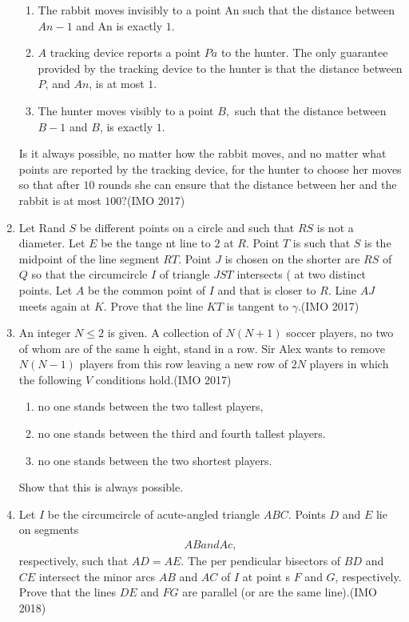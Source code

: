 \begin{enumerate}
  \begin{enumerate}[label=(\roman*)]
  \item The rabbit moves invisibly to a point An such that the distance between $An-1$ and An is exactly $1$.
 \item $A$ tracking device reports a point $Pa$ to the hunter. The only guarantee provided by the tracking device to the hunter is that the distance between $    P$, and $An$, is at most $1$.
\item The hunter moves visibly to a point $B,$ such that the distance between $B-1$ and $B$, is exactly $1$.
 \end{enumerate}
 Is it always possible, no matter how the rabbit moves, and no matter what points are reported by the tracking device, for the hunter to choose her moves so that after $10$ rounds she can ensure that the distance between her and the rabbit is at most $100?$\hfill (IMO 2017)
\item Let Rand $S$ be different points on a circle and such that $RS$ is not a diameter. Let $E$ be the tange    nt line to $2$ at $R$. Point $T$ is such that $S$ is the midpoint of the line segment $RT$. Point $J$ is chosen on the shorter are $RS$ of $Q$ so that the circumcircle $I$ of triangle $JST$ intersects ( at two distinct points. Let $A$ be the common point of $I$ and that is closer to $R$. Line $AJ$ meets again at $K$. Prove that the line $KT$ is tangent to $\gamma$.\hfill (IMO 2017)
\item An integer $N\leq2$ is given. A collection of $N(N+1)$ soccer players, no two of whom are of the same h    eight, stand in a row. Sir Alex wants to remove $N(N-1)$ players from this row leaving a new row of $2N$ players in which the following $V$ conditions hold.\hfill (IMO 2017)                                         
	\begin{enumerate}                
		\item no one stands between the two tallest players,        
\item no one stands between the third and fourth tallest players.                                       
\item no one stands between the two shortest players.                                                           
	\end{enumerate}                         
	Show that this is always possible.
\item Let $I$ be the circumcircle of acute-angled triangle $ABC$. Points $D$ and $E$     lie on segments \begin{align}AB and Ac,\end{align} respectively, such that $AD=AE$. The per    pendicular bisectors of $BD$ and $CE$ intersect the minor arcs $AB$ and $AC$ of $I$ at point    s $F$ and $G$, respectively. Prove that the lines $DE$ and $FG$ are parallel (or are the same line).\hfill (IMO 2018)

\end{enumerate}
